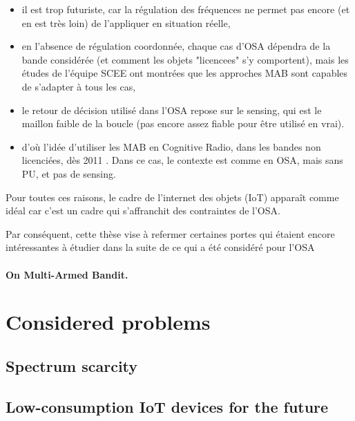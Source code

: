 \begin{itemize}
    \item il est trop futuriste, car la régulation des fréquences ne permet pas encore (et en est très loin) de l'appliquer en situation réelle,
    \item en l'absence de régulation coordonnée, chaque cas d'OSA dépendra de la bande considérée (et comment les objets "licencees" s'y comportent), mais les études de l'équipe SCEE ont montrées que les approches MAB sont capables de s'adapter à tous les cas,
    \item le retour de décision utilisé dans l'OSA repose sur le sensing, qui est le maillon faible de la boucle (pas encore assez fiable pour être utilisé en vrai).
    \item d'où l'idée d'utiliser les MAB en Cognitive Radio, dans les bandes non licenciées, dès 2011 \cite{Jouini12}. Dans ce cas, le contexte est comme en OSA, mais sans PU, et pas de sensing.
\end{itemize}

Pour toutes ces raisons, le cadre de l'internet des objets (IoT) apparaît comme idéal car c'est un cadre qui s'affranchit des contraintes de l'OSA.

Par conséquent, cette thèse vise à refermer certaines portes qui étaient encore intéressantes à étudier dans la suite de ce qui a été considéré pour l'OSA

\paragraph{On Multi-Armed Bandit.}


\section{Considered problems}
\label{sec:1:problems}


\subsection{Spectrum scarcity}


\subsection{Low-consumption IoT devices for the future}


